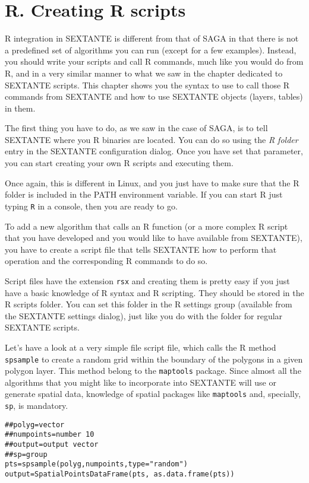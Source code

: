 \section{R. Creating R scripts}\label{rscripts}

R integration in SEXTANTE is different from that of SAGA in that there is not a predefined set of algorithms you can run (except for a few examples). Instead, you should write your scripts and call R commands, much like you would do from R, and in a very similar manner to what we saw in the chapter dedicated to SEXTANTE scripts. This chapter shows you the syntax to use to call those R commands from SEXTANTE and how to use SEXTANTE objects (layers, tables) in them.

The first thing you have to do, as we saw in the case of SAGA, is to tell SEXTANTE where you R binaries are located. You can do so using the \emph{R folder} entry in the SEXTANTE configuration dialog. Once you have set that parameter, you can start creating your own R scripts and executing them.

Once again, this is different in Linux, and you just have to make sure that the R folder is included in the PATH environment variable. If you can start R just typing \texttt{R} in a console, then you are ready to go.

To add a new algorithm that calls an R function (or a more complex R script that you have developed and you would like to have available from SEXTANTE), you have to create a script file that tells SEXTANTE how to perform that operation and the corresponding R commands to do so.

Script files have the extension \texttt{rsx} and creating them is pretty easy if you just have a basic knowledge of R syntax and R scripting. They should be stored in the R scripts folder. You can set this folder in the R settings group (available from the SEXTANTE settings dialog), just like you do with the folder for regular SEXTANTE scripts. 

Let's have a look at a very simple file script file, which calls the R method \texttt{spsample} to create a random grid within the boundary of the polygons in a given polygon layer. This method belong to the \texttt{maptools} package. Since almost all the algorithms that you might like to incorporate into SEXTANTE will use or generate spatial data, knowledge of spatial packages like \texttt{maptools} and, specially, \texttt{sp}, is mandatory.

\begin{verbatim}
##polyg=vector
##numpoints=number 10
##output=output vector
##sp=group
pts=spsample(polyg,numpoints,type="random")
output=SpatialPointsDataFrame(pts, as.data.frame(pts))
\end{verbatim}


